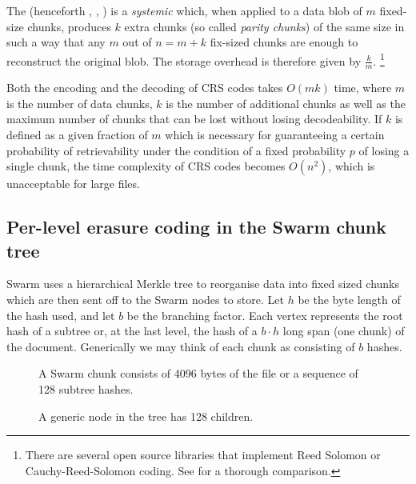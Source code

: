 The  (henceforth , \cite{lubyetal1995CRS}, \cite{plank2006optimizing}) is a \emph{systemic}  which, when applied to a data blob of $m$ fixed-size chunks, produces $k$ extra chunks (so called \emph{parity chunks}) of the same size in such a way that any $m$ out of $n=m+k$ fix-sized chunks are enough to reconstruct the original blob. The storage overhead is therefore given by $\frac{k}{m}$.%
%
\footnote{%
There are several open source libraries that implement Reed Solomon or Cauchy-Reed-Solomon coding. See \cite{plank2009performance} for a thorough comparison.}

Both the encoding and the decoding of CRS codes takes $O(mk)$ time, where $m$ is the number of data chunks, $k$ is the number of additional chunks as well as the maximum number of chunks that can be lost without losing decodeability. If $k$ is defined as a given fraction of $m$ which is necessary for guaranteeing a certain probability of retrievability under the condition of a fixed probability $p$ of losing a single chunk, the time complexity of CRS codes becomes $O(n^2)$, which is unacceptable for large files. 

\subsection{Per-level erasure coding in the Swarm chunk tree \statusgreen}

Swarm uses a hierarchical Merkle tree \cite{merkle1980protocols} to reorganise data into fixed sized chunks which are then sent off to the Swarm nodes to store.
Let $h$ be the byte length of the hash used, and let $b$ be the branching factor. Each vertex represents the root hash of a subtree or, at the last level, the hash of a $b\cdot h$ long span (one chunk) of the document. Generically we may think of each chunk as consisting of $b$ hashes.


\begin{figure}[htbp]
   \centering
   
   \caption[Swarm chunk \statusgreen]{A Swarm chunk consists of 4096 bytes of the file or a sequence of 128 subtree hashes.}
   \label{fig:chunk}
\end{figure}


\begin{figure}[htbp]
   \centering
   
   \caption[A generic node in the tree has 128 children \statusgreen]{A generic node in the tree has 128 children.}
   \label{fig:Swarm-hash-basic}
\end{figure}

